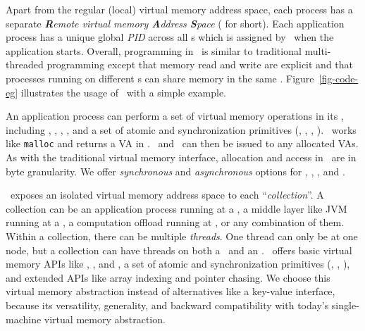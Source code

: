 Apart from the regular (local) virtual memory address space, each process has a separate {\em \textbf{R}emote virtual memory \textbf{A}ddress \textbf{S}pace} ({\em \rspace} for short).
Each application process has a unique global {\em PID} across all \CN{}s which is assigned by \sys\ when the application starts.
Overall, programming in \rspace\ is similar to traditional multi-threaded programming except that memory read and write are explicit and that processes running on different \CN{}s can share memory in the same \rspace.
Figure~\ref{fig-code-eg} illustrates the usage of \sys\ with a simple example.


An application process can perform a set of virtual memory operations in its \rspace,
including \alloc, \sysfree, \Cliosysread, \Cliosyswrite, 
and a set of atomic and synchronization primitives (\eg, \syslock, \sysunlock, \fence).
\alloc\ works like \texttt{malloc} and returns a VA in \rspace. \Cliosysread\ and \Cliosyswrite\ can then be issued to any allocated VAs.
As with the traditional virtual memory interface, allocation and access in \rspace\ are in byte granularity.
We offer {\em synchronous} and {\em asynchronous} options for \alloc, \sysfree, \Cliosysread, and \Cliosyswrite.




\sys\ exposes an isolated virtual memory address space to each ``{\em collection}''.
A collection can be an application process running at a \CN, a middle layer like JVM running at a \CN, a computation offload running at \MN, or any combination of them.
Within a collection, there can be multiple {\em threads}. 
One thread can only be at one node, but a collection can have threads on both a \CN\ and an \MN.
\sys\ offers basic virtual memory APIs like \alloc, \Cliosysread, and \Cliosyswrite, 
a set of atomic and synchronization primitives (\tas, \cas, \fence), 
and extended APIs like array indexing and pointer chasing.
We choose this virtual memory abstraction instead of alternatives like a key-value interface,
because its versatility, generality, and backward compatibility with today's single-machine virtual memory abstraction.
\fi



